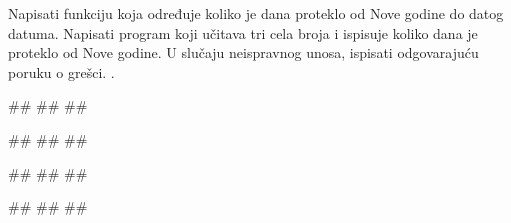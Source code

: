 \begin{Exercise}[label=FUN_26] 
Napisati funkciju  koja određuje koliko je dana proteklo od Nove godine do
datog datuma. Napisati program koji učitava tri cela broja i ispisuje
koliko dana je proteklo od Nove godine. 
U slučaju neispravnog unosa, ispisati odgovarajuću poruku o grešci. 
.

\begin{miditest}
\begin{upotreba}{1}
#\naslovInt#
##
##
\end{upotreba}
\end{miditest}
\begin{miditest}
\begin{upotreba}{2}
#\naslovInt#
##
##
\end{upotreba}
\end{miditest}

\begin{miditest}
\begin{upotreba}{3}
#\naslovInt#
##
##
\end{upotreba}
\end{miditest}
\begin{miditest}
\begin{upotreba}{4}
#\naslovInt#
##
##
\end{upotreba}
\end{miditest}

\end{Exercise}


